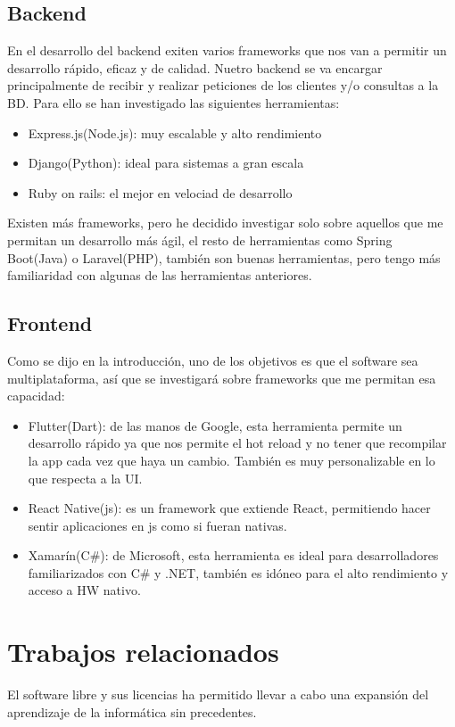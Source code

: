 \subsection{Backend}

En el desarrollo del backend exiten varios frameworks que nos van a permitir un desarrollo rápido, eficaz y de calidad. Nuetro backend se va encargar principalmente de recibir y realizar peticiones de los clientes y/o consultas a la BD. Para ello se han investigado las siguientes herramientas:

\begin{itemize}
	\item Express.js(Node.js): muy escalable y alto rendimiento
	\item Django(Python): ideal para sistemas a gran escala
	\item Ruby on rails: el mejor en velociad de desarrollo
\end{itemize}

Existen más frameworks, pero he decidido investigar solo sobre aquellos que me permitan un desarrollo más ágil, el resto de herramientas como Spring Boot(Java) o Laravel(PHP), también son buenas herramientas, pero tengo más familiaridad con algunas de las herramientas anteriores.

\subsection{Frontend}

Como se dijo en la introducción, uno de los objetivos es que el software sea multiplataforma, así que se investigará sobre frameworks que me permitan esa capacidad:

\begin{itemize}
	\item Flutter(Dart): de las manos de Google, esta herramienta permite un desarrollo rápido ya que nos permite el hot reload y no tener que recompilar la app cada vez que haya un cambio. También es muy personalizable en lo que respecta a la UI.
	\item React Native(js): es un framework que extiende React, permitiendo hacer sentir aplicaciones en js como si fueran nativas.
	\item Xamarín(C\#): de Microsoft, esta herramienta es ideal para desarrolladores familiarizados con C\# y .NET, también es idóneo para el alto rendimiento y acceso a HW nativo.
\end{itemize}

\section{Trabajos relacionados}
El software libre y sus licencias \cite{gplv3} ha permitido llevar a cabo una expansión del aprendizaje de la informática sin precedentes.
